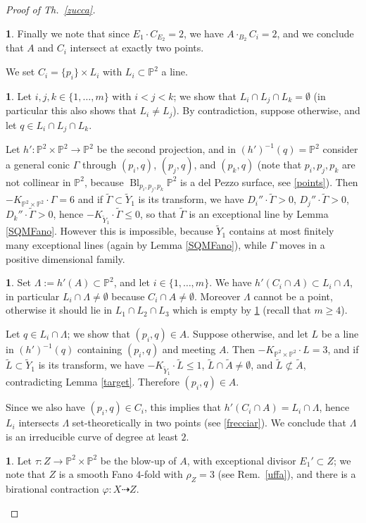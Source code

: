 \documentclass[a4paper,12pt]{amsart}
\theoremstyle{definition}
\newtheorem{prg}[thm]{}
\numberwithin{figure}{section}
\numberwithin{table}{section}
\newcommand{\ph}{\varphi}
\newcommand{\w}{\widetilde}
\newcommand{\pr}{\mathbb{P}}
\newcommand{\Bl}{\operatorname{Bl}}
\begin{document}
\begin{proof}[Proof of Th.~\ref{zucca}]
\begin{prg}
 Finally we note that since $E_1\cdot C_{E_2}=2$, we have $A\cdot_{B_2}C_i=2$, and we conclude that $A$ and $C_i$ intersect at exactly two points.

We set $C_i=\{p_i\}\times L_i$ with $L_i\subset\pr^2$ a line.
  \end{prg}
  \begin{prg}\label{roma}
    Let $i,j,k\in\{1,\dotsc,m\}$ with $i<j<k$; we show that $L_i\cap L_j\cap L_k=\emptyset$ (in particular this also shows that $L_i\neq L_j$). By contradiction, suppose otherwise, and let $q\in L_i\cap L_j\cap L_k$.

  Let $h'\colon \pr^2\times\pr^2\to\pr^2$ be the second projection,  and 
  in $(h')^{-1}(q)=\pr^2$ consider a general conic $\Gamma$ through $(p_i,q)$, $(p_j,q)$, and $(p_k,q)$ (note that $p_i,p_j,p_k$ are not collinear in $\pr^2$, because $\Bl_{p_i,p_j,p_k}\pr^2$ is a del Pezzo surface, see \ref{points}). Then $-K_{\pr^2\times\pr^2}\cdot \Gamma=6$ and if $\w{\Gamma}\subset\w{Y}_1$ is its transform, we have $D_i''\cdot\w{\Gamma}>0$, $D_j''\cdot\w{\Gamma}>0$,  $D_k''\cdot\w{\Gamma}>0$, hence
  $-K_{\w{Y}_1}\cdot\w{\Gamma}\leq 0$, so that $\w{\Gamma}$ is an exceptional line by Lemma \ref{SQMFano}. However this is impossible, because $\w{Y}_1$ contains at most finitely many exceptional lines (again by Lemma \ref{SQMFano}), while $\Gamma$ moves in a positive dimensional family.
  \end{prg}
\begin{prg}\label{torq}
  Set $\Lambda:=h'(A)\subset\pr^2$, and let $i\in\{1,\dotsc,m\}$. We  have $h'(C_i\cap A)\subset L_i\cap\Lambda$, in particular $L_i\cap \Lambda\neq \emptyset$ because $C_i\cap A\neq\emptyset$. Moreover $\Lambda$ cannot be a point, otherwise it should lie in $L_1\cap L_2\cap L_3$ which is empty by \ref{roma} (recall that $m\geq 4$). 

  Let $q\in L_i\cap \Lambda$; we show that $(p_i,q)\in A$. Suppose otherwise, and let $L$ be a line in $(h')^{-1}(q)$ containing $(p_i,q)$ and meeting $A$.
  Then $-K_{\pr^2\times\pr^2}\cdot L=3$, and if $\w{L}\subset\w{Y}_1$ is its transform, we have $-K_{\w{Y}_1}\cdot\w{L}\leq 1$, $\w{L}\cap\w{A}\neq\emptyset$, and $\w{L}\not\subset\w{A}$,  contradicting Lemma \ref{target}.
  Therefore $(p_i,q)\in A$.

 Since we also have $(p_i,q)\in C_i$, this implies that $h'(C_i\cap A)=L_i\cap \Lambda$, hence $L_i$ intersects $\Lambda$ set-theoretically in two points (see \ref{frecciar}). 
  We conclude that $\Lambda$ is an irreducible curve of degree at least $2$.
\end{prg}
\begin{prg}\label{tauZ}
  Let $\tau\colon Z\to\pr^2\times\pr^2$ be the blow-up of $A$, with exceptional divisor
  $E_1'\subset Z$; we note that 
  $Z$ is a smooth Fano $4$-fold with $\rho_Z=3$ (see Rem.~\ref{uffa}), and there is a birational contraction $\ph\colon X\dasharrow Z$.  


\end{prg}
\end{proof}
\end{document}
